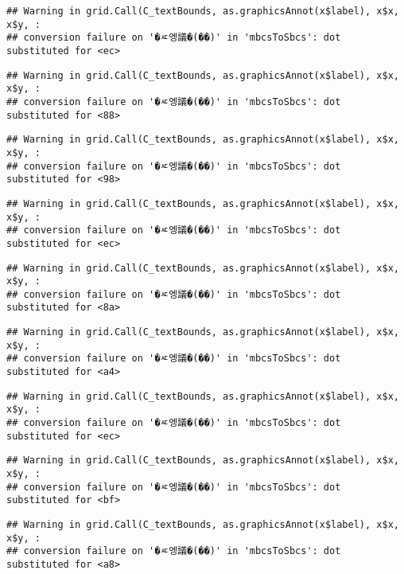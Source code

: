 \documentclass[
]{article}
\begin{document}
\begin{verbatim}
## Warning in grid.Call(C_textBounds, as.graphicsAnnot(x$label), x$x, x$y, :
## conversion failure on '�ㅼ엥議�(��)' in 'mbcsToSbcs': dot substituted for <ec>
\end{verbatim}

\begin{verbatim}
## Warning in grid.Call(C_textBounds, as.graphicsAnnot(x$label), x$x, x$y, :
## conversion failure on '�ㅼ엥議�(��)' in 'mbcsToSbcs': dot substituted for <88>
\end{verbatim}

\begin{verbatim}
## Warning in grid.Call(C_textBounds, as.graphicsAnnot(x$label), x$x, x$y, :
## conversion failure on '�ㅼ엥議�(��)' in 'mbcsToSbcs': dot substituted for <98>
\end{verbatim}

\begin{verbatim}
## Warning in grid.Call(C_textBounds, as.graphicsAnnot(x$label), x$x, x$y, :
## conversion failure on '�ㅼ엥議�(��)' in 'mbcsToSbcs': dot substituted for <ec>
\end{verbatim}

\begin{verbatim}
## Warning in grid.Call(C_textBounds, as.graphicsAnnot(x$label), x$x, x$y, :
## conversion failure on '�ㅼ엥議�(��)' in 'mbcsToSbcs': dot substituted for <8a>
\end{verbatim}

\begin{verbatim}
## Warning in grid.Call(C_textBounds, as.graphicsAnnot(x$label), x$x, x$y, :
## conversion failure on '�ㅼ엥議�(��)' in 'mbcsToSbcs': dot substituted for <a4>
\end{verbatim}

\begin{verbatim}
## Warning in grid.Call(C_textBounds, as.graphicsAnnot(x$label), x$x, x$y, :
## conversion failure on '�ㅼ엥議�(��)' in 'mbcsToSbcs': dot substituted for <ec>
\end{verbatim}

\begin{verbatim}
## Warning in grid.Call(C_textBounds, as.graphicsAnnot(x$label), x$x, x$y, :
## conversion failure on '�ㅼ엥議�(��)' in 'mbcsToSbcs': dot substituted for <bf>
\end{verbatim}

\begin{verbatim}
## Warning in grid.Call(C_textBounds, as.graphicsAnnot(x$label), x$x, x$y, :
## conversion failure on '�ㅼ엥議�(��)' in 'mbcsToSbcs': dot substituted for <a8>
\end{verbatim}
\end{document}
